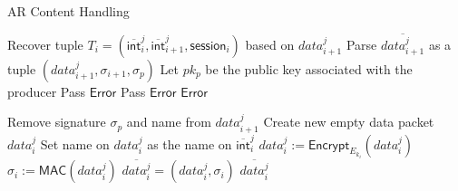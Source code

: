 \documentclass[10pt]{article}
\begin{document}
\begin{algorithm}[ht!]
  \caption{AR Content Handling}
  \begin{algorithmic}[1]
\State Recover tuple $T_i = (\overline{\mathsf{int}}_{i}^{j}, \overline{\mathsf{int}}_{i+1}^{j}, \mathsf{session}_i)$ based on $data_{i+1}^j$
\State Parse $\overline{data_{i+1}^j}$ as a tuple $(data_{i+1}^j, \sigma_{i+1}, \sigma_p)$
  \State Let $pk_p$ be the public key associated with the producer
    \State Pass
  \Else
    \State \Return $\mathsf{Error}$ 
  \EndIf
{}
    \State Pass
  \Else
    \State \Return $\mathsf{Error}$ 
  \EndIf
\Else {}
  \State \Return $\mathsf{Error}$
\EndIf

\State Remove signature $\sigma_p$ and name from $data_{i+1}^j$ %
\State Create new empty data packet $data_i^j$
\State Set name on $data_i^j$ as the name on $\overline{\mathsf{int}}_{i}^{j}$
\State $data_i^j := \mathsf{Encrypt}_{E_{k_i}}(data_i^j)$
\State $\sigma_i := \mathsf{MAC}(data_i^j)$
\State $\overline{data_{i}^j} = (data_i^j, \sigma_i)$
\State \Return $\overline{data_{i}^j}$ 

\end{algorithmic}
\label{alg:ar_content_handler}
\end{algorithm}
\end{document}
